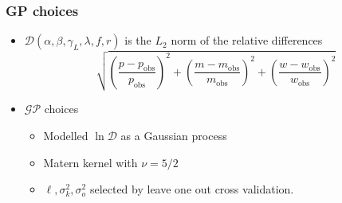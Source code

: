 \documentclass{beamer}
\begin{document}
\begin{frame}
    \frametitle{GP choices}
    \begin{itemize}
        \item $\mathcal{D}(\alpha, \beta, \gamma_L, \lambda, f, r)$ is the
              $L_2$ norm of the relative differences
              $$
                  \sqrt{
                      \left(\frac{p - p_\text{obs}}{p_\text{obs}}\right)^2
                      + \left(\frac{m - m_\text{obs}}{m_\text{obs}}\right)^2
                      + \left(\frac{w - w_\text{obs}}{w_\text{obs}}\right)^2
                  }
              $$
        \item $\mathcal{GP}$ choices
              \begin{itemize}
                  \item Modelled $\ln\mathcal{D}$ as a Gaussian process
                  \item Matern kernel with $\nu = 5/2$
                  \item $\ell, \sigma^2_k, \sigma^2_o$ selected by leave
                        one out cross validation.
              \end{itemize}
    \end{itemize}
\end{frame}
\end{document}
